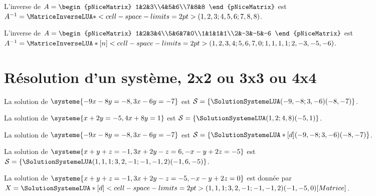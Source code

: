 \documentclass[french,a4paper,10pt]{article}
\begin{document}
\begin{demohigh}
L'inverse de $A=\begin{pNiceMatrix} 1&2&3\\4&5&6\\7&8&8 \end{pNiceMatrix}$ est
$A^{-1}=\MatriceInverseLUA*<cell-space-limits=2pt>(1,2,3;4,5,6;7,8,8)$.
\end{demohigh}

\begin{demohigh}
L'inverse de $A=\begin{pNiceMatrix} 1&2&3&4\\5&6&7&0\\1&1&1&1\\2&-3&-5&-6 \end{pNiceMatrix}$
est $A^{-1}=\MatriceInverseLUA*[n]<cell-space-limits=2pt>(1,2,3,4;5,6,7,0;1,1,1,1;2,-3,-5,-6)$.
\end{demohigh}

\pagebreak

\section{Résolution d'un système, 2x2 ou 3x3 ou 4x4}

\begin{demohigh}
La solution de $\systeme{-9x-8y=-8,3x-6y=-7}$ est $\mathcal{S}=%
\left\lbrace \SolutionSystemeLUA(-9,-8;3,-6)(-8,-7) \right\rbrace$.
\end{demohigh}

\begin{demohigh}
La solution de $\systeme{x+2y=-5,4x+8y=1}$ est $\mathcal{S}=%
\left\lbrace \SolutionSystemeLUA(1,2;4,8)(-5,1) \right\rbrace$.
\end{demohigh}

\begin{demohigh}
La solution de $\systeme{-9x-8y=-8,3x-6y=-7}$ est $\mathcal{S}=%
\left\lbrace \SolutionSystemeLUA*[d](-9,-8;3,-6)(-8,-7) \right\rbrace$.
\end{demohigh}

\begin{demohigh}
La solution de $\systeme{x+y+z=-1,3x+2y-z=6,-x-y+2z=-5}$ est $\mathcal{S}=%
\left\lbrace \SolutionSystemeLUA(1,1,1;3,2,-1;-1,-1,2)(-1,6,-5) \right\rbrace$.
\end{demohigh}

\begin{demohigh}
La solution de $\systeme{x+y+z=-1,3x+2y-z=-5,-x-y+2z=0}$ est donnée par $X=%
\SolutionSystemeLUA*[d]<cell-space-limits=2pt>(1,1,1;3,2,-1;-1,-1,2)(-1,-5,0)[Matrice]$.
\end{demohigh}
\end{document}
